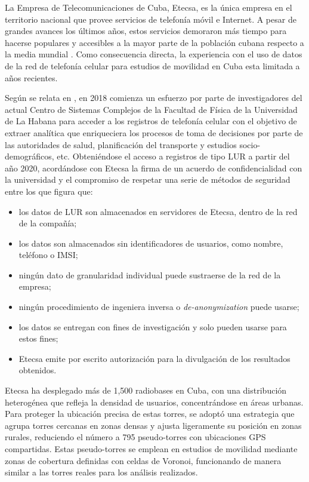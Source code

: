 La Empresa de Telecomunicaciones de Cuba, Etecsa, es la única empresa en el territorio nacional que provee servicios de telefonía móvil e Internet. A pesar de grandes avances los últimos años, estos servicios demoraron más tiempo para hacerse populares y accesibles a la mayor parte de la población cubana respecto a la media mundial \cite{durive2021sistema}. Como consecuencia directa, la experiencia con el uso de datos de la red de telefonía celular para estudios de movilidad en Cuba esta limitada a años recientes.

Según se relata en \cite{durive2021sistema}, en 2018 comienza un esfuerzo por parte de investigadores del actual Centro de Sistemas Complejos de la Facultad de Física de la Universidad de La Habana para acceder a los registros de telefonía celular con el objetivo de extraer analítica que enriqueciera los procesos de toma de decisiones por parte de las autoridades de salud, planificación del transporte y estudios socio-demográficos, etc. Obteniéndose el acceso a registros de tipo LUR a partir del año 2020, acordándose con Etecsa la firma de un acuerdo de confidencialidad con la universidad y el compromiso de respetar una serie de métodos de seguridad entre los que figura que:

\begin{itemize}
    \item los datos de LUR son almacenados en servidores de Etecsa, dentro de la red de la compañía;
    \item los datos son almacenados sin identificadores de usuarios, como nombre, teléfono o IMSI;
    \item ningún dato de granularidad individual puede sustraerse de la red de la empresa;
    \item ningún procedimiento de ingeniera inversa o \textit{de-anonymization} puede usarse;
    \item los datos se entregan con fines de investigación y solo pueden usarse para estos fines;
    \item Etecsa emite por escrito autorización para la divulgación de los resultados obtenidos.
\end{itemize}

Etecsa ha desplegado más de 1,500 radiobases en Cuba, con una distribución heterogénea que refleja la densidad de usuarios, concentrándose en áreas urbanas. Para proteger la ubicación precisa de estas torres, se adoptó una estrategia que agrupa torres cercanas en zonas densas y ajusta ligeramente su posición en zonas rurales, reduciendo el número a 795 pseudo-torres con ubicaciones GPS compartidas. Estas pseudo-torres se emplean en estudios de movilidad mediante zonas de cobertura definidas con celdas de Voronoi, funcionando de manera similar a las torres reales para los análisis realizados.


